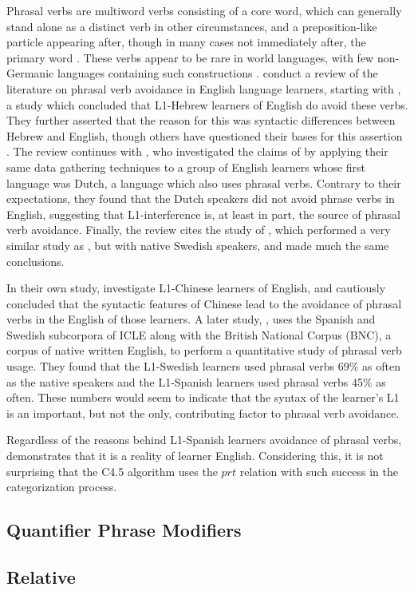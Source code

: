 \documentclass[main.tex]{subfiles}
\begin{document}
Phrasal verbs are multiword verbs consisting of a core word, which can generally stand alone as a distinct verb in other circumstances, and a preposition-like particle appearing after, though in many cases not immediately after, the primary word \citep{celce-murcia:1999}. These verbs appear to be rare in world languages, with few non-Germanic languages containing such constructions \citep{celce-murcia:1999}. \citet{liao:2004} conduct a review of the literature on phrasal verb avoidance in English language learners, starting with \citep{dagut:1985}, a study which concluded that L1-Hebrew learners of English do avoid these verbs. They further asserted that the reason for this was syntactic differences between Hebrew and English, though others have questioned their bases for this assertion \citep{liao:2004}. The review continues with \citep{hulstijn:1989}, who investigated the claims of \citeauthor{dagut:1985} by applying their same data gathering techniques to a group of English learners whose first language was Dutch, a language which also uses phrasal verbs. Contrary to their expectations, they found that the Dutch speakers did not avoid phrase verbs in English, suggesting that L1-interference is, at least in part, the source of phrasal verb avoidance. Finally, the review cites the study of \citet{laufer:1993}, which performed a very similar study as \citeauthor{hulstijn:1989}, but with native Swedish speakers, and made much the same conclusions.

In their own study, \citeauthor{liao:2004} investigate L1-Chinese learners of English, and cautiously concluded that the syntactic features of Chinese lead to the avoidance of phrasal verbs in the English of those learners. A later study, \citet{gonzalez:2010}, uses the Spanish and Swedish subcorpora of ICLE along with the British National Corpus (BNC), a corpus of native written English, to perform a quantitative study of phrasal verb usage. They found that the L1-Swedish learners used phrasal verbs 69\% as often as the native speakers and the L1-Spanish learners used phrasal verbs 45\% as often. These numbers would seem to indicate that the syntax of the learner's L1 is an important, but not the only, contributing factor to phrasal verb avoidance.

Regardless of the reasons behind L1-Spanish learners avoidance of phrasal verbs, \citet{gonzalez:2010} demonstrates that it is a reality of learner English. Considering this, it is not surprising that the C4.5 algorithm uses the $prt$ relation with such success in the categorization process.


\subsection{Quantifier Phrase Modifiers}
\subsection{Relative}


\biblio
\end{document}
